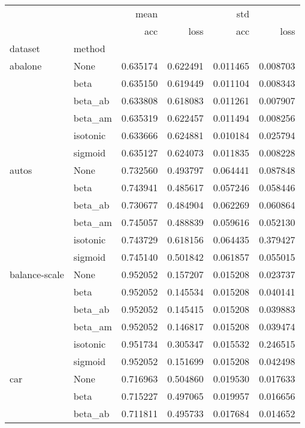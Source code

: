\begin{tabular}{llrrrr}
\toprule
        &      &      mean &           &       std &           \\
        &      &       acc &      loss &       acc &      loss \\
dataset & method &           &           &           &           \\
\midrule
abalone & None &  0.635174 &  0.622491 &  0.011465 &  0.008703 \\
        & beta &  0.635150 &  0.619449 &  0.011104 &  0.008343 \\
        & beta\_ab &  0.633808 &  0.618083 &  0.011261 &  0.007907 \\
        & beta\_am &  0.635319 &  0.622457 &  0.011494 &  0.008256 \\
        & isotonic &  0.633666 &  0.624881 &  0.010184 &  0.025794 \\
        & sigmoid &  0.635127 &  0.624073 &  0.011835 &  0.008228 \\
autos & None &  0.732560 &  0.493797 &  0.064441 &  0.087848 \\
        & beta &  0.743941 &  0.485617 &  0.057246 &  0.058446 \\
        & beta\_ab &  0.730677 &  0.484904 &  0.062269 &  0.060864 \\
        & beta\_am &  0.745057 &  0.488839 &  0.059616 &  0.052130 \\
        & isotonic &  0.743729 &  0.618156 &  0.064435 &  0.379427 \\
        & sigmoid &  0.745140 &  0.501842 &  0.061857 &  0.055015 \\
balance-scale & None &  0.952052 &  0.157207 &  0.015208 &  0.023737 \\
        & beta &  0.952052 &  0.145534 &  0.015208 &  0.040141 \\
        & beta\_ab &  0.952052 &  0.145415 &  0.015208 &  0.039883 \\
        & beta\_am &  0.952052 &  0.146817 &  0.015208 &  0.039474 \\
        & isotonic &  0.951734 &  0.305347 &  0.015532 &  0.246515 \\
        & sigmoid &  0.952052 &  0.151699 &  0.015208 &  0.042498 \\
car & None &  0.716963 &  0.504860 &  0.019530 &  0.017633 \\
        & beta &  0.715227 &  0.497065 &  0.019957 &  0.016656 \\
        & beta\_ab &  0.711811 &  0.495733 &  0.017684 &  0.014652 \\

\end{tabular}
